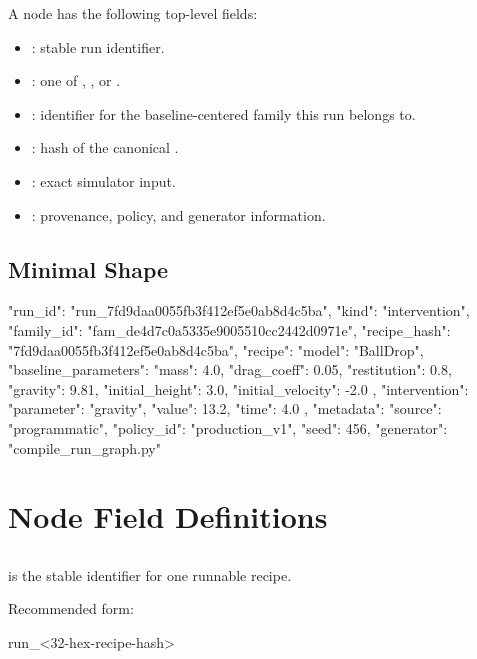 \documentclass[11pt]{article}
\begin{document}
A node has the following top-level fields:

\begin{itemize}
\item {}: stable run identifier.
\item {}: one of , , or .
\item {}: identifier for the baseline-centered family this run belongs to.
\item {}: hash of the canonical .
\item {}: exact simulator input.
\item {}: provenance, policy, and generator information.
\end{itemize}

\subsection*{Minimal Shape}

\begin{DocCode}
{
  "run_id": "run_7fd9daa0055fb3f412ef5e0ab8d4c5ba",
  "kind": "intervention",
  "family_id": "fam_de4d7c0a5335e9005510cc2442d0971e",
  "recipe_hash": "7fd9daa0055fb3f412ef5e0ab8d4c5ba",
  "recipe": {
    "model": "BallDrop",
    "baseline_parameters": {
      "mass": 4.0,
      "drag_coeff": 0.05,
      "restitution": 0.8,
      "gravity": 9.81,
      "initial_height": 3.0,
      "initial_velocity": -2.0
    },
    "intervention": {
      "parameter": "gravity",
      "value": 13.2,
      "time": 4.0
    }
  },
  "metadata": {
    "source": "programmatic",
    "policy_id": "production_v1",
    "seed": 456,
    "generator": "compile_run_graph.py"
  }
}
\end{DocCode}

\section*{Node Field Definitions}

\subsection*{\texorpdfstring{}{run\_id}}

 is the stable identifier for one runnable recipe.

Recommended form:

\begin{DocCode}
run_<32-hex-recipe-hash>
\end{DocCode}
\end{document}
